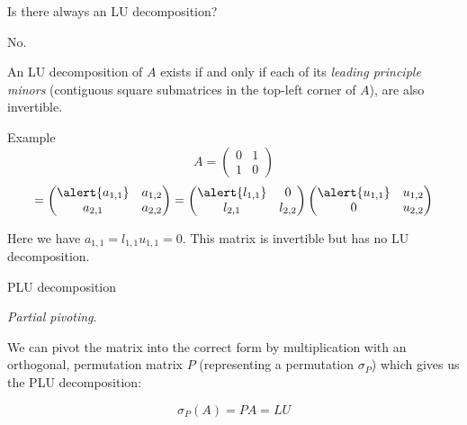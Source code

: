 \documentclass{beamer}
\begin{document}
\begin{frame}{Is there always an LU decomposition?}

    \alert{No.}

    An LU decomposition of $A$ exists if and only if each of its \emph{leading principle minors}
    (contiguous square submatrices in the top-left corner of $A$),
    are also invertible.

    \pause{}

    \begin{exampleblock}{Example}
        \[
            \mathbin{A = \begin{pmatrix}{}
                0 & 1 \\
                1 & 0
            \end{pmatrix} }
\]
\[
            = \begin{pmatrix}{}
                \alert{a_{1,1}} & a_{1,2} \\
                a_{2,1} & a_{2,2}
            \end{pmatrix}
            = \begin{pmatrix}{}
                \alert{l_{1,1}} & 0 \\
                l_{2,1} & l_{2,2}
            \end{pmatrix}
            \begin{pmatrix}{}
                \alert{u_{1,1}} & u_{1,2} \\
                0 & u_{2,2}
            \end{pmatrix}
        \]

        Here we have $a_{1,1} = l_{1,1}u_{1,1} = 0.$
        \bigbreak
        This matrix is invertible but has no LU decomposition.
    \end{exampleblock}

    \pause{}


\end{frame}

\begin{frame}{PLU decomposition}

    \emph{Partial pivoting}.

    We can pivot the matrix into the correct form by multiplication with
    an orthogonal, permutation matrix $P$ (representing a permutation $\sigma_P$)
    which gives us the PLU decomposition:

    \[
        \sigma_P(A) = PA = LU
    \]

\end{frame}
\end{document}
